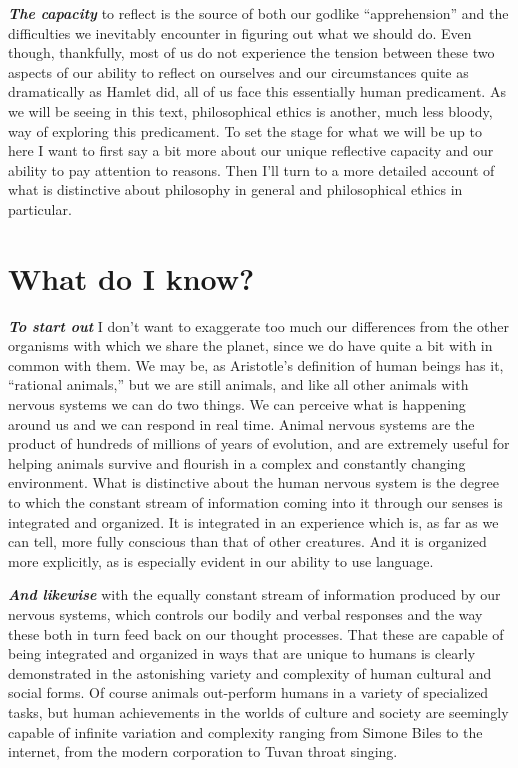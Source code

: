 \documentclass[12pt, openany]{book}
\begin{document}
\textbf{\emph{The capacity}} to reflect is the source of both our godlike ``apprehension'' and the difficulties we inevitably encounter in figuring out what we should do. Even though, thankfully, most of us do not experience the tension between these two aspects of our ability to reflect on ourselves and our circumstances quite as dramatically as Hamlet did, all of us face this essentially human predicament. As we will be seeing in this text, philosophical ethics is another, much less bloody, way of exploring this predicament. To set the stage for what we will be up to here I want to first say a bit more about our unique reflective capacity and our ability to pay attention to reasons. Then I'll turn to a more detailed account of what is distinctive about philosophy in general and philosophical ethics in particular.

\hypertarget{what-do-i-know}{%
\section{What do I know?}\label{what-do-i-know}}

\textbf{\emph{To start out}} I don't want to exaggerate too much our differences from the other organisms with which we share the planet, since we do have quite a bit with in common with them. We may be, as Aristotle's definition of human beings has it, ``rational animals,'' but we are still animals, and like all other animals with nervous systems we can do two things. We can perceive what is happening around us and we can respond in real time. Animal nervous systems are the product of hundreds of millions of years of evolution, and are extremely useful for helping animals survive and flourish in a complex and constantly changing environment. What is distinctive about the human nervous system is the degree to which the constant stream of information coming into it through our senses is integrated and organized. It is integrated in an experience which is, as far as we can tell, more fully conscious than that of other creatures. And it is organized more explicitly, as is especially evident in our ability to use language.

\textbf{\emph{And likewise}} with the equally constant stream of information produced by our nervous systems, which controls our bodily and verbal responses and the way these both in turn feed back on our thought processes. That these are capable of being integrated and organized in ways that are unique to humans is clearly demonstrated in the astonishing variety and complexity of human cultural and social forms. Of course animals out-perform humans in a variety of specialized tasks, but human achievements in the worlds of culture and society are seemingly capable of infinite variation and complexity ranging from Simone Biles to the internet, from the modern corporation to Tuvan throat singing.
\end{document}
